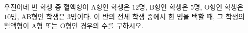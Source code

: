 \hspace*{2mm}\begin{minipage}[t]{\dimexpr\linewidth-2mm\relax}\vspace{0pt}
우진이네 반 학생 중 혈액형이 $\mathrm{A}$형인 학생은 $12$명, $\mathrm{B}$형인 학생은 $5$명, $\mathrm{O}$형인 학생은 $10$명, $\mathrm{AB}$형인 학생은 $3$명이다. 이 반의 전체 학생 중에서 한 명을 택할 때, 그 학생의 혈액형이 $\mathrm{A}$형 또는 $\mathrm{O}$형인 경우의 수를 구하시오.\end{minipage}
